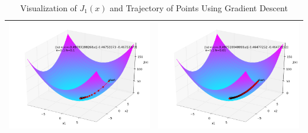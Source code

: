 \begin{itemize}
\begin{table}[ht]
\begin{tabular}{|c|c|}
\includegraphics[width=8cm]{J1_3.png}&\includegraphics[width=8cm]{J1_4.png}\\
\hline
\end{tabular}
\caption{Visualization of $J_1(x)$ and Trajectory of Points Using Gradient Descent}
\label{J1}
\end{table}


\end{itemize}
